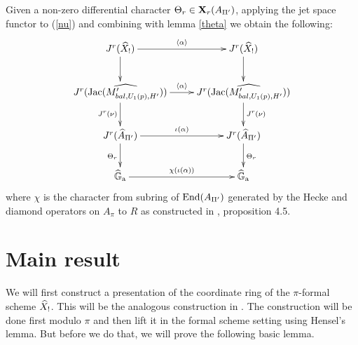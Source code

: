\documentclass{amsart}
\def \hG{\widehat{\mathbb{G}}_{\mathrm{a}}}
\numberwithin{equation}{section}
\def \mb{\mbox}
\newcommand{\Cs}{M'_{bal,U_1(p),H'}}
\newcommand{\Jac}{\mb{Jac}(\Cs)}
\newcommand{\End}{\mathrm{End}}
\begin{document}
Given a non-zero differential character $\Theta_r \in {\bf X}_r(A_{\Pi'})$, 
applying the jet space functor to (\ref{nu}) and combining with lemma 
\ref{theta} we obtain the following:
\begin{align}
\label{Psichi}
\xymatrix{
J^r(\wh{X}_!) \ar[d] \ar[r]^{\langle \alpha \rangle} & J^r(\wh{X}_!) \ar[d] \\
J^r(\wh{\Jac}) \ar[d]_{J^r(\nu)} \ar[r]^{\langle \alpha \rangle} & 
J^r(\wh{\Jac}) \ar[d]^{J^r(\nu)} \\
J^r(\wh{A}_{\pip'}) \ar[d]_{\Theta_r} \ar[r]^{\iota(\alpha)} & 
J^r(\wh{A}_{\pip'})\ar[d]^{\Theta_r}
\\ 
\hG \ar[r]^{\chi(\iota(\alpha))} & \hG
}
\end{align}
where $\chi$ is the character from subring of $\End(A_{\pip'})$ generated by
the Hecke and diamond operators on 
$A_\pi$ to $R$ as constructed in \cite{MR2400054}, proposition 4.5. 



\section{Main result}
\label{main-result}




We will first construct a presentation of the coordinate ring of the
$\pi$-formal scheme $\widehat{X}_!$. This will be the analogous construction in 
\cite{MR2882615}. The construction will be done first modulo $\pi$ and then 
lift it in the formal scheme setting using Hensel's lemma.
But before we do that, we will prove the following basic lemma.
\end{document}
